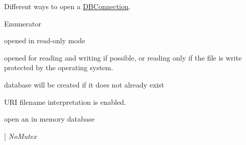 Different ways to open a \hyperlink{a00004}{D\-B\-Connection}. 

\begin{Desc}
\item[Enumerator]\par
\begin{description}
\item[{\em 
\hypertarget{a00038_a0d8721ab00cfcf85ba4eed715ccfececa131fb182a881796e7606ed6da27f1197}{Read\-Only}\label{a00038_a0d8721ab00cfcf85ba4eed715ccfececa131fb182a881796e7606ed6da27f1197}
}]opened in read-\/only mode \item[{\em 
\hypertarget{a00038_a0d8721ab00cfcf85ba4eed715ccfececa70a2a84088d405a2e3f1e3accaa16723}{Read\-Write}\label{a00038_a0d8721ab00cfcf85ba4eed715ccfececa70a2a84088d405a2e3f1e3accaa16723}
}]opened for reading and writing if possible, or reading only if the file is write protected by the operating system. \item[{\em 
\hypertarget{a00038_a0d8721ab00cfcf85ba4eed715ccfececa686e697538050e4664636337cc3b834f}{Create}\label{a00038_a0d8721ab00cfcf85ba4eed715ccfececa686e697538050e4664636337cc3b834f}
}]database will be created if it does not already exist \item[{\em 
\hypertarget{a00038_a0d8721ab00cfcf85ba4eed715ccfececa8447306210a0972ac94b7d774799df1a}{U\-R\-I}\label{a00038_a0d8721ab00cfcf85ba4eed715ccfececa8447306210a0972ac94b7d774799df1a}
}]U\-R\-I filename interpretation is enabled. \item[{\em 
\hypertarget{a00038_a0d8721ab00cfcf85ba4eed715ccfececa4789f23283b3a61f858b641a1bef19a3}{Memory}\label{a00038_a0d8721ab00cfcf85ba4eed715ccfececa4789f23283b3a61f858b641a1bef19a3}
}]open an in memory database \item[{\em 
\hypertarget{a00038_a0d8721ab00cfcf85ba4eed715ccfececaed897a216de36c7c934c4baa02b4fea7}{No\-Mutex}\label{a00038_a0d8721ab00cfcf85ba4eed715ccfececaed897a216de36c7c934c4baa02b4fea7}
}
\end{description}
\end{Desc}
